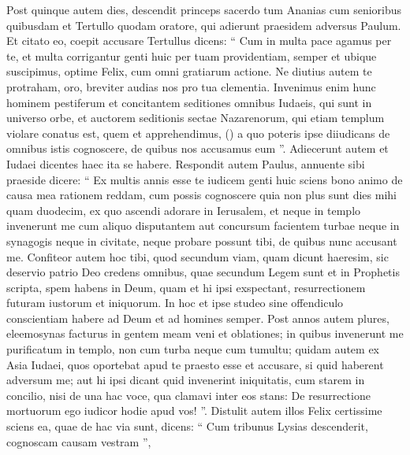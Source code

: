 \begin{biblechapter}
\begin{biblechapter}
\begin{biblechapter}
\begin{biblechapter}
\begin{biblechapter}
\begin{biblechapter}
\begin{biblechapter}
\begin{biblechapter}
\begin{biblechapter}
\begin{biblechapter}
\begin{biblechapter}
\begin{biblechapter}
\begin{biblechapter}
\begin{biblechapter}
\begin{biblechapter}
\begin{biblechapter}
\begin{biblechapter}
\begin{biblechapter}
\begin{biblechapter}
\begin{biblechapter}
\begin{biblechapter}
\begin{biblechapter}
\begin{biblechapter}
\begin{biblechapter}
\verse Post quinque autem dies, descendit princeps sacerdo tum Ananias cum senioribus quibusdam et Tertullo quodam oratore, qui adierunt praesidem adversus Paulum. 
\verse Et citato eo, coepit accusare Tertullus dicens: “ Cum in multa pace agamus per te, et multa corrigantur genti huic per tuam providentiam, 
\verse semper et ubique suscipimus, optime Felix, cum omni gratiarum actione. 
\verse Ne diutius autem te protraham, oro, breviter audias nos pro tua clementia. 
\verse Invenimus enim hunc hominem pestiferum et concitantem seditiones omnibus Iudaeis, qui sunt in universo orbe, et auctorem seditionis sectae Nazarenorum, 
 \verse qui etiam templum violare conatus est, quem et apprehendimus, 
(\verse) \verse a quo poteris ipse diiudicans de omnibus istis cognoscere, de quibus nos accusamus eum ”. 
\verse Adiecerunt autem et Iudaei dicentes haec ita se habere.
 \verse Respondit autem Paulus, annuente sibi praeside dicere: “ Ex multis annis esse te iudicem genti huic sciens bono animo de causa mea rationem reddam, 
\verse cum possis cognoscere quia non plus sunt dies mihi quam duodecim, ex quo ascendi adorare in Ierusalem, 
\verse et neque in templo invenerunt me cum aliquo disputantem aut concursum facientem turbae neque in synagogis neque in civitate, 
 \verse neque probare possunt tibi, de quibus nunc accusant me. 
\verse Confiteor autem hoc tibi, quod secundum viam, quam dicunt haeresim, sic deservio patrio Deo credens omnibus, quae secundum Legem sunt et in Prophetis scripta, 
\verse spem habens in Deum, quam et hi ipsi exspectant, resurrectionem futuram iustorum et iniquorum. 
\verse In hoc et ipse studeo sine offendiculo conscientiam habere ad Deum et ad homines semper. 
\verse Post annos autem plures, eleemosynas facturus in gentem meam veni et oblationes; 
\verse in quibus invenerunt me purificatum in templo, non cum turba neque cum tumultu; 
\verse quidam autem ex Asia Iudaei, quos oportebat apud te praesto esse et accusare, si quid haberent adversum me; 
\verse aut hi ipsi dicant quid invenerint iniquitatis, cum starem in concilio, 
\verse nisi de una hac voce, qua clamavi inter eos stans: De resurrectione mortuorum ego iudicor hodie apud vos! ”.
 \verse Distulit autem illos Felix certissime sciens ea, quae de hac via sunt, dicens: “ Cum tribunus Lysias descenderit, cognoscam causam vestram ”, 

\end{biblechapter}
\end{biblechapter}
\end{biblechapter}
\end{biblechapter}
\end{biblechapter}
\end{biblechapter}
\end{biblechapter}
\end{biblechapter}
\end{biblechapter}
\end{biblechapter}
\end{biblechapter}
\end{biblechapter}
\end{biblechapter}
\end{biblechapter}
\end{biblechapter}
\end{biblechapter}
\end{biblechapter}
\end{biblechapter}
\end{biblechapter}
\end{biblechapter}
\end{biblechapter}
\end{biblechapter}
\end{biblechapter}
\end{biblechapter}
